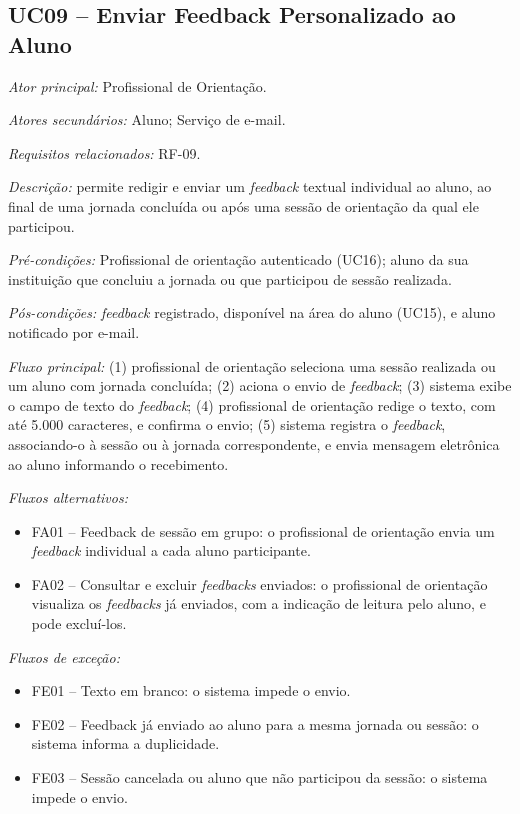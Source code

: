 \subsection*{UC09 -- Enviar Feedback Personalizado ao Aluno}\label{uc:uc09}

\textit{Ator principal:} Profissional de Orientação.

\textit{Atores secundários:} Aluno; Serviço de e-mail.

\textit{Requisitos relacionados:} RF-09.

\textit{Descrição:} permite redigir e enviar um \textit{feedback} textual individual ao aluno, ao final de uma jornada concluída ou após uma sessão de orientação da qual ele participou.

\textit{Pré-condições:} Profissional de orientação autenticado (UC16); aluno da sua instituição que concluiu a jornada ou que participou de sessão realizada.

\textit{Pós-condições:} \textit{feedback} registrado, disponível na área do aluno (UC15), e aluno notificado por e-mail.

\textit{Fluxo principal:} (1) profissional de orientação seleciona uma sessão realizada ou um aluno com jornada concluída; (2) aciona o envio de \textit{feedback}; (3) sistema exibe o campo de texto do \textit{feedback}; (4) profissional de orientação redige o texto, com até 5.000 caracteres, e confirma o envio; (5) sistema registra o \textit{feedback}, associando-o à sessão ou à jornada correspondente, e envia mensagem eletrônica ao aluno informando o recebimento.

\textit{Fluxos alternativos:}

\begin{itemize}[label={},leftmargin=\parindent,itemsep=0pt,topsep=0pt]
  \item FA01 – Feedback de sessão em grupo: o profissional de orientação envia um \textit{feedback} individual a cada aluno participante.
  \item FA02 – Consultar e excluir \textit{feedbacks} enviados: o profissional de orientação visualiza os \textit{feedbacks} já enviados, com a indicação de leitura pelo aluno, e pode excluí-los.
\end{itemize}

\textit{Fluxos de exceção:}

\begin{itemize}[label={},leftmargin=\parindent,itemsep=0pt,topsep=0pt]
  \item FE01 – Texto em branco: o sistema impede o envio.
  \item FE02 – Feedback já enviado ao aluno para a mesma jornada ou sessão: o sistema informa a duplicidade.
  \item FE03 – Sessão cancelada ou aluno que não participou da sessão: o sistema impede o envio.
\end{itemize}

